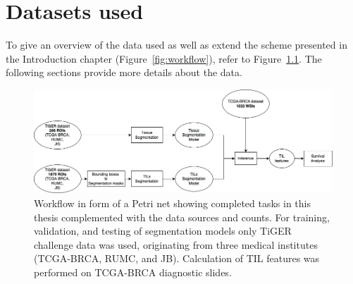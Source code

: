 \chapter{Datasets used}
To give an overview of the data used as well as extend the scheme presented in
the Introduction chapter (Figure~\ref*{fig:workflow}), refer to Figure~\ref*{fig:data_flow}.
The following sections provide more details about the data.

\begin{figure}[h]
  \centering
  \includegraphics[width=\linewidth]{figures/data_flow.png} 
  \caption{Workflow in form of a Petri net showing completed tasks in this thesis complemented with the data sources and counts.
  For training, validation, and testing of segmentation models only TiGER challenge data was used, originating from three medical institutes (TCGA-BRCA, RUMC, and JB).
  Calculation of TIL features was performed on TCGA-BRCA diagnostic slides.} 
  \label{fig:data_flow}
\end{figure} 


